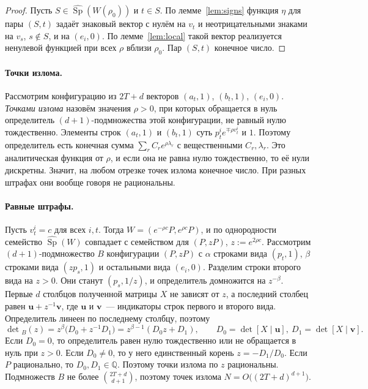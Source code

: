 \documentclass[a4paper,11pt]{article}
\theoremstyle{plain}
\theoremstyle{definition}
\theoremstyle{remark}
\newcommand{\Q}{\mathbb{Q}}
\DeclareMathOperator{\Sp}{Sp}
\begin{document}
\begin{proof}
    Пусть $S\in\widehat{\Sp}(W(\rho_0))$ и $t\in S$. По лемме~\ref{lem:signs} функция $\eta$ для пары $(S,t)$ задаёт знаковый вектор с нулём на $v_t$ и неотрицательными знаками на $v_s$, $s\notin S$, и на $(e_i,0)$. По лемме~\ref{lem:local} такой вектор реализуется ненулевой функцией при всех $\rho$ вблизи $\rho_0$. Пар $(S,t)$ конечное число.
\end{proof}

\paragraph{Точки излома.} Рассмотрим конфигурацию из $2T+d$ векторов $(a_t,1)$, $(b_t,1)$, $(e_i,0)$. \textit{Точками излома} назовём значения $\rho>0$, при которых обращается в нуль определитель $(d+1)$-подмножества этой конфигурации, не равный нулю тождественно. Элементы строк $(a_t,1)$ и $(b_t,1)$ суть $p^i_te^{\mp\rho v^i_t}$ и $1$. Поэтому определитель есть конечная сумма $\sum_rC_re^{\rho\lambda_r}$ с вещественными $C_r,\lambda_r$. Это аналитическая функция от $\rho$, и если она не равна нулю тождественно, то её нули дискретны. Значит, на любом отрезке точек излома конечное число. При разных штрафах они вообще говоря не рациональны.

\paragraph{Равные штрафы.} Пусть $v^i_t=c$ для всех $i,t$. Тогда $W=(e^{-\rho c}P,e^{\rho c}P)$, и по однородности семейство $\widehat{\Sp}(W)$ совпадает с семейством для $(P,zP)$, $z:=e^{2\rho c}$. Рассмотрим $(d+1)$-подмножество $B$ конфигурации $(P,zP)$ с $\alpha$ строками вида $(p_t,1)$, $\beta$ строками вида $(zp_s,1)$ и остальными вида $(e_i,0)$. Разделим строки второго вида на $z>0$. Они станут $(p_s,1/z)$, и определитель домножится на $z^{-\beta}$. Первые $d$ столбцов полученной матрицы $X$ не зависят от $z$, а последний столбец равен $\mathbf u+z^{-1}\mathbf v$, где $\mathbf u$ и $\mathbf v$~--- индикаторы строк первого и второго вида. Определитель линеен по последнему столбцу, поэтому
\[
    \det{}_B(z)=z^{\beta}\bigl(D_0+z^{-1}D_1\bigr)=z^{\beta-1}(D_0z+D_1),\qquad D_0=\det[X\mid\mathbf u],\ D_1=\det[X\mid\mathbf v].
\]
Если $D_0=0$, то определитель равен нулю тождественно или не обращается в нуль при $z>0$. Если $D_0\ne0$, то у него единственный корень $z=-D_1/D_0$. Если $P$ рационально, то $D_0,D_1\in\Q$. Поэтому точки излома по $z$ рациональны. Подмножеств $B$ не более $\binom{2T+d}{d+1}$, поэтому точек излома $N=O\bigl((2T+d)^{d+1}\bigr)$.
\end{document}
